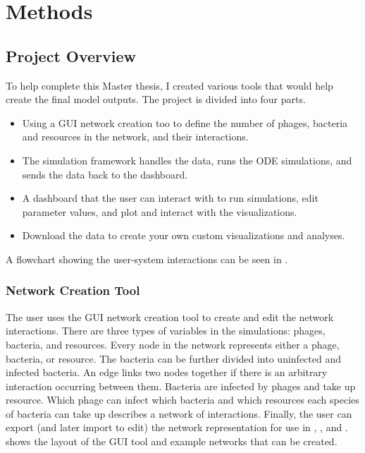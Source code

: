 \chapter{Methods}
\label{Methods}
\section{Project Overview}
To help complete this Master thesis, I created various tools that would help create the final model outputs.
The project is divided into four parts. 
\begin{itemize}
    \item Using a GUI network creation too to define the number of phages, bacteria and resources in the network, and their interactions. 
    \item The simulation framework handles the data, runs the ODE simulations, and sends the data back to the dashboard. 
    \item A dashboard that the user can interact with to run simulations, edit parameter values, and plot and interact with the visualizations. 
    \item Download the data to create your own custom visualizations and analyses. 
\end{itemize}

A flowchart showing the user-system interactions can be seen in . 

\subsection{Network Creation Tool}
\label{sec:network_creation_tool}
The user uses the GUI network creation tool to create and edit the network interactions. 
There are three types of variables in the simulations: phages, bacteria, and resources. 
Every node in the network represents either a phage, bacteria, or resource. 
The bacteria can be further divided into uninfected and infected bacteria. 
An edge links two nodes together if there is an arbitrary interaction occurring between them. 
Bacteria are infected by phages and take up resource. 
Which phage can infect which bacteria and which resources each species of bacteria can take up describes a network of interactions. 
Finally, the user can export (and later import to edit) the network representation for use in , , and . 
 shows the layout of the GUI tool and example networks that can be created. 

